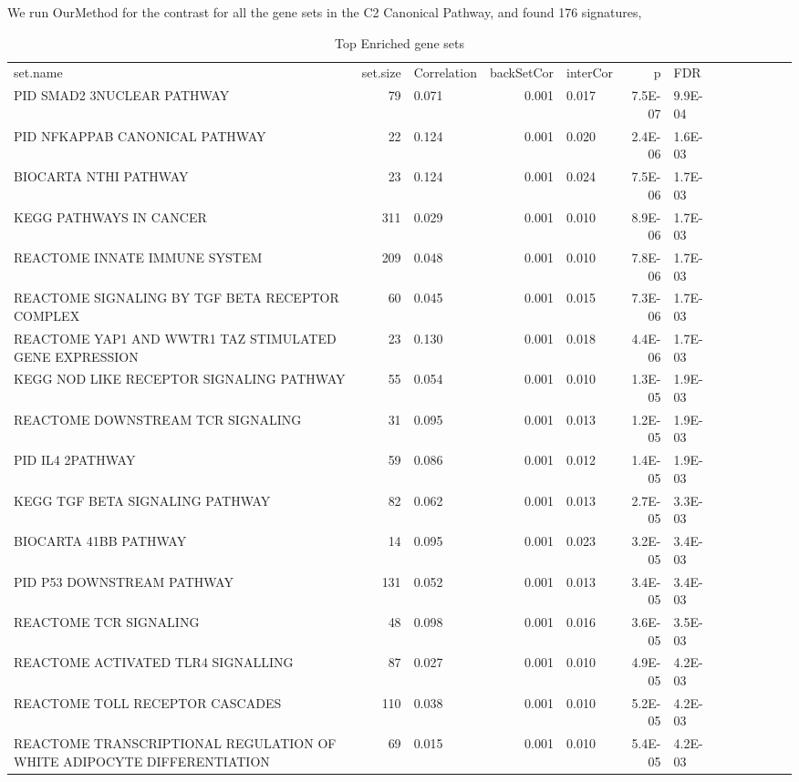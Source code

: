 \documentclass[11pt, a4paper]{article}
\begin{document}
		 
		 We run OurMethod for the contrast for all the gene sets in the C2 Canonical Pathway, and found 176 signatures,
		{\scriptsize
		\begin{longtable}{p{3in}rp{0.5in}rp{0.5in}rp{0.5in}rp{0.5in}rp{0.5in}rp{0.5in}}
			\label{figure:topEnrich} \\
			\caption{Top Enriched gene sets} \\
			\hline
			\hline
			set.name & set.size & Correlation & backSetCor & interCor & p & FDR \\ 
			\hline
			PID SMAD2 3NUCLEAR PATHWAY & 79 & 0.071 & 0.001 & 0.017 & 7.5E-07 & 9.9E-04 \\ 
			PID NFKAPPAB CANONICAL PATHWAY & 22 & 0.124 & 0.001 & 0.020 & 2.4E-06 & 1.6E-03 \\ 
			BIOCARTA NTHI PATHWAY & 23 & 0.124 & 0.001 & 0.024 & 7.5E-06 & 1.7E-03 \\ 
			KEGG PATHWAYS IN CANCER & 311 & 0.029 & 0.001 & 0.010 & 8.9E-06 & 1.7E-03 \\ 
			REACTOME INNATE IMMUNE SYSTEM & 209 & 0.048 & 0.001 & 0.010 & 7.8E-06 & 1.7E-03 \\ 
			REACTOME SIGNALING BY TGF BETA RECEPTOR COMPLEX & 60 & 0.045 & 0.001 & 0.015 & 7.3E-06 & 1.7E-03 \\ 
			REACTOME YAP1 AND WWTR1 TAZ STIMULATED GENE EXPRESSION & 23 & 0.130 & 0.001 & 0.018 & 4.4E-06 & 1.7E-03 \\ 
			KEGG NOD LIKE RECEPTOR SIGNALING PATHWAY & 55 & 0.054 & 0.001 & 0.010 & 1.3E-05 & 1.9E-03 \\ 
			REACTOME DOWNSTREAM TCR SIGNALING & 31 & 0.095 & 0.001 & 0.013 & 1.2E-05 & 1.9E-03 \\ 
			PID IL4 2PATHWAY & 59 & 0.086 & 0.001 & 0.012 & 1.4E-05 & 1.9E-03 \\ 
			KEGG TGF BETA SIGNALING PATHWAY & 82 & 0.062 & 0.001 & 0.013 & 2.7E-05 & 3.3E-03 \\ 
			BIOCARTA 41BB PATHWAY & 14 & 0.095 & 0.001 & 0.023 & 3.2E-05 & 3.4E-03 \\ 
			PID P53 DOWNSTREAM PATHWAY & 131 & 0.052 & 0.001 & 0.013 & 3.4E-05 & 3.4E-03 \\ 
			REACTOME TCR SIGNALING & 48 & 0.098 & 0.001 & 0.016 & 3.6E-05 & 3.5E-03 \\ 
			REACTOME ACTIVATED TLR4 SIGNALLING & 87 & 0.027 & 0.001 & 0.010 & 4.9E-05 & 4.2E-03 \\ 
			REACTOME TOLL RECEPTOR CASCADES & 110 & 0.038 & 0.001 & 0.010 & 5.2E-05 & 4.2E-03 \\ 
			REACTOME TRANSCRIPTIONAL REGULATION OF WHITE ADIPOCYTE DIFFERENTIATION & 69 & 0.015 & 0.001 & 0.010 & 5.4E-05 & 4.2E-03 \\ 

\end{longtable}}
\end{document}

